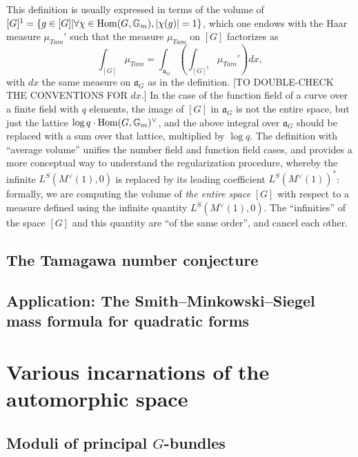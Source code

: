\begin{remark}
 \label{remark-Tamagawa-measure}
 This definition is usually expressed in terms of the volume of $[G]^1=\{g\in [G]| \forall \chi\in \mathop{\rm Hom}\nolimits(G, \mathbb G_m), |\chi(g)|=1\}$, which one endows with the Haar measure $\mu_{Tam}'$ such that the measure $\mu_{Tam}$ on $[G]$ factorizes as
 $$ \int_{[G]} \mu_{Tam} = \int_{\mathfrak a_G} (\int_{[G]^1} \mu_{Tam}') dx,$$
 with $dx$ the same measure on $\mathfrak a_G$ as in the definition. [TO DOUBLE-CHECK THE CONVENTIONS FOR $dx$.] In the case of the function field of a curve over a finite field with $q$ elements, the image of $[G]$ in $\mathfrak a_G$ is not the entire space, but just the lattice $\log q \cdot \mathop{\rm Hom}\nolimits(G, \mathbb G_m)^\vee$, and the above integral over $\mathfrak a_G$ should be replaced with a sum over that lattice, multiplied by $\log q$. The definition with ``average volume'' unifies the number field and function field cases, and provides a more conceptual way to understand the regularization procedure, whereby the infinite $L^S(M^\vee(1),0)$ is replaced by its leading coefficient $L^S(M^\vee(1))^*$: formally, we are computing the volume of \emph{the entire space} $[G]$ with respect to a measure defined using the infinite quantity $L^S(M^\vee(1),0)$. The ``infinities'' of the space $[G]$ and this quantity are ``of the same order'', and cancel each other.
\end{remark}

\subsection{The Tamagawa number conjecture}
\label{subsection-Tamagawa-conjecture}

\subsection{Application: The Smith--Minkowski--Siegel mass formula for quadratic forms}
\label{subsection-mass-formula}


\section{Various incarnations of the automorphic space}
\label{section-incarnations}

\subsection{Moduli of principal $G$-bundles}
\label{subsection-BunG}


